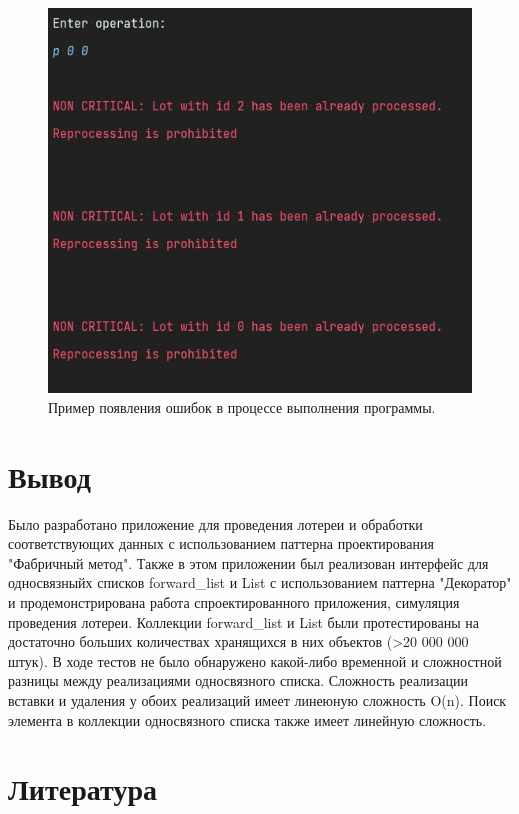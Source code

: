 \documentclass[a4paper,14pt]{article}
\begin{document}
\begin{figure}[H]
  \centering
  \captionsetup{justification=centering,margin=1cm}
  \includegraphics{pictures/11}
  \caption{Пример появления ошибок в процессе выполнения программы.}
\end{figure}
\clearpage

\section{Вывод}
Было разработано приложение для проведения лотереи и обработки соответствующих данных с использованием паттерна проектирования "Фабричный метод". Также в этом приложении был реализован интерфейс для односвязныйх списков forward_list и List с использованием паттерна "Декоратор" и продемонстрирована работа спроектированного приложения, симуляция проведения лотереи.
Коллекции forward_list и List были протестированы на достаточно больших количествах хранящихся в них объектов (>20 000 000 штук). В ходе тестов не было обнаружено какой-либо временной и сложностной разницы между реализациями односвязного списка. Сложность реализации вставки и удаления у обоих реализаций имеет линеюную сложность O(n). Поиск элемента в коллекции односвязного списка также имеет линейную сложность.
\newpage

\section{Литература}
\end{document}

